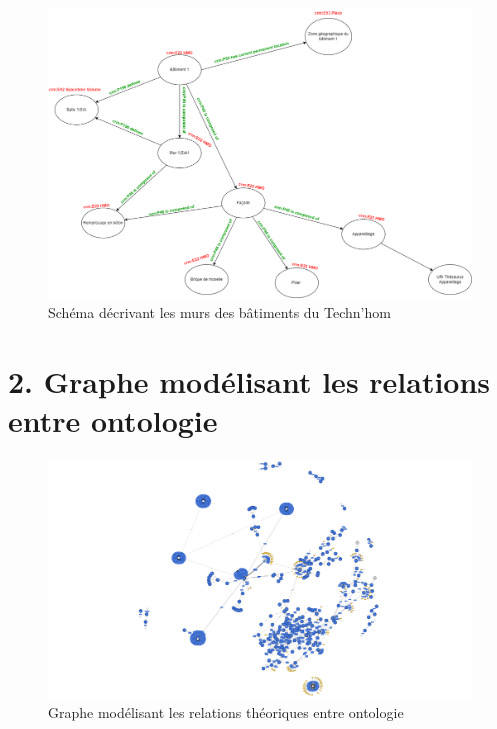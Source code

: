 \begin{figure} [H]
    \centering
    \includegraphics[width=1\textwidth]{assets/annexes/schema_desciption_mur.png}
    \caption{Schéma décrivant les murs des bâtiments du Techn'hom}
    \label{fig:schemaMursTTM}
\end{figure}

\section*{2. Graphe modélisant les relations entre ontologie}\label{annexe2}
\begin{figure} [H]
    \centering
    \includegraphics[width=1\textwidth]{assets/annexes/scheam_decla_ontologie.png}
    \caption{Graphe modélisant les relations théoriques entre ontologie}
    \label{fig:schemaGrapheOntologie}
\end{figure}

